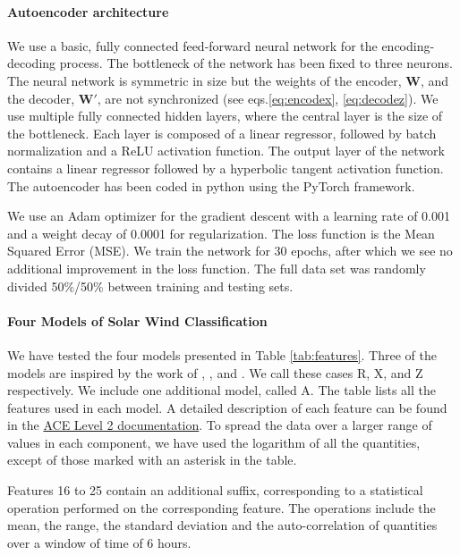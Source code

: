 \paragraph{Autoencoder architecture}
We use a basic, fully connected feed-forward neural network for the encoding-decoding process. The bottleneck of the network has been fixed to three neurons. The neural network is symmetric in size but the weights of the encoder, $\boldsymbol{W}$, and the decoder, $\boldsymbol{W'}$, are not synchronized (see eqs.\eqref{eq:encodex}, \eqref{eq:decodez}). We use multiple fully connected hidden layers, where the central layer is the size of the bottleneck. Each layer is composed of a linear regressor, followed by batch normalization and a ReLU activation function. The output layer of the network contains a linear regressor followed by a hyperbolic tangent activation function. The autoencoder has been coded in python using the PyTorch framework.

We use an Adam optimizer \citep{Kingma2014} for the gradient descent with a learning rate of 0.001 and a weight decay of 0.0001 for regularization. The loss function is the Mean Squared Error (MSE). We train the network for 30 epochs, after which we see no additional improvement in the loss function. The full data set was randomly divided 50\%/50\% between training and testing sets.

\paragraph{Four Models of Solar Wind Classification}
\label{sec:fourmodels}
We have tested the four models presented in Table \ref{tab:features}. Three of the models are inspired by the work of \citep{Roberts2020}, \citep{Xu2015b}, and \citep{Zhao2009}. We call these cases R, X, and Z respectively. We include one additional model, called A. The table lists all the features used in each model. A detailed description of each feature can be found in the \href{http://www.srl.caltech.edu/cgi-bin/dib/rundibviewmultil2/ACE/ASC/DATA/level2/multi}{ACE Level 2 documentation}. To spread the data over a larger range of values in each component, we have used the logarithm of all the quantities, except of those marked with an asterisk in the table.

Features 16 to 25 contain an additional suffix, corresponding to a statistical operation performed on the corresponding feature. The operations include the mean, the range, the standard deviation and the auto-correlation of quantities over a window of time of 6 hours.

